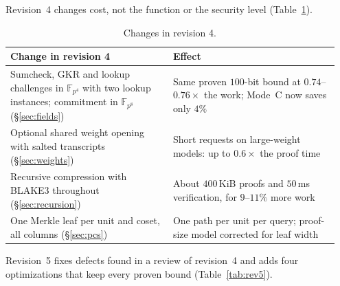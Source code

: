 \documentclass[11pt]{article}
\newcommand{\F}{\mathbb{F}}
\newcommand{\Fq}{\F_{p^4}}
\newcommand{\Fo}{\F_{p^8}}
\begin{document}
Revision~4 changes cost, not the function or the security level (Table~\ref{tab:rev4}).

\begin{table}[h]
\centering\small
\begin{tabular}{@{}p{0.47\linewidth}p{0.48\linewidth}@{}}
\toprule
Change in revision 4 & Effect \\
\midrule
Sumcheck, GKR and lookup challenges in \(\Fq\) with two lookup instances; commitment in \(\Fo\) (\S\ref{sec:fields}) & Same proven \(100\)-bit bound at \(0.74\)--\(0.76\times\) the work; Mode~C now saves only \(4\%\) \\
Optional shared weight opening with salted transcripts (\S\ref{sec:weights}) & Short requests on large-weight models: up to \(0.6\times\) the proof time \\
Recursive compression with BLAKE3 throughout (\S\ref{sec:recursion}) & About \(400\)\,KiB proofs and \(50\)\,ms verification, for \(9\)--\(11\%\) more work \\
One Merkle leaf per unit and coset, all columns (\S\ref{sec:pcs}) & One path per unit per query; proof-size model corrected for leaf width \\
\bottomrule
\end{tabular}
\caption{Changes in revision 4.}
\label{tab:rev4}
\end{table}

Revision~5 fixes defects found in a review of revision~4 and adds four optimizations that keep every proven bound (Table~\ref{tab:rev5}).
\end{document}
